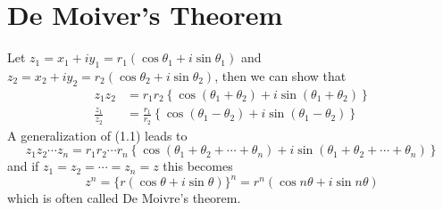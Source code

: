 \section{De Moiver's Theorem}
Let $z_1=x_1+i y_1=r_1\left(\cos \theta_1+i \sin \theta_1\right)$ and $z_2=x_2+i y_2=r_2\left(\cos \theta_2+i \sin \theta_2\right)$, then we can show that
\begin{align}
z_1 z_2 & =r_1 r_2\left\{\cos \left(\theta_1+\theta_2\right)+i \sin \left(\theta_1+\theta_2\right)\right\} \\
\frac{z_1}{z_2} & =\frac{r_1}{r_2}\left\{\cos \left(\theta_1-\theta_2\right)+i \sin \left(\theta_1-\theta_2\right)\right\}
\end{align}
A generalization of (1.1) leads to
$$
z_1 z_2 \cdots z_n=r_1 r_2 \cdots r_n\left\{\cos \left(\theta_1+\theta_2+\cdots+\theta_n\right)+i \sin \left(\theta_1+\theta_2+\cdots+\theta_n\right)\right\}
$$
and if $z_1=z_2=\cdots=z_n=z$ this becomes
$$
z^n=\{r(\cos \theta+i \sin \theta)\}^n=r^n(\cos n \theta+i \sin n \theta)
$$
which is often called De Moivre's theorem.
